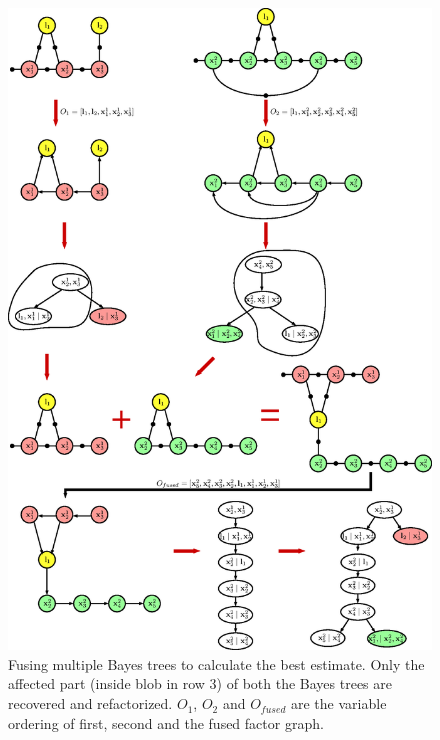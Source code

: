 \begin{figure}
\centering
\includegraphics[height=\textheight,width=\textwidth]{Chapters/figures3/fusing_bt}
\caption{Fusing multiple Bayes trees to calculate the best estimate. Only the affected part (inside blob in row 3) of both the Bayes trees are recovered and refactorized. $O_1$, $O_2$ and $O_{fused}$ are the variable ordering of first, second and the fused factor graph.}
\label{fig:fusing_bt}
\end{figure}
